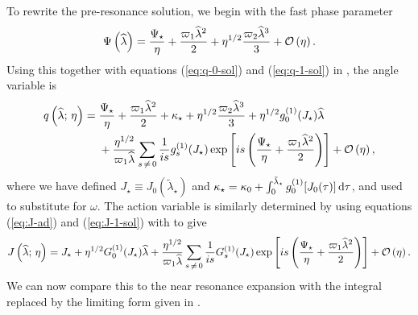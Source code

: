To rewrite the pre-resonance solution, we begin with the fast phase parameter
\begin{equation}
\Psi\left(\widehat{\lambda}\right) = \dfrac{\Psi_\star}{\eta} + \dfrac{\varpi_1\widehat{\lambda}^2}{2} + \eta^{1/2}\dfrac{\varpi_2\widehat{\lambda}^3}{3} + \mathcal{O}\left({\eta}\right).
\end{equation}
Using this together with equations (\ref{eq:q-0-sol}) and (\ref{eq:q-1-sol}) in , the angle variable is
\begin{align}
q\left(\widehat{\lambda};\,\eta\right) = {} & \dfrac{\Psi_\star}{\eta} + \dfrac{\varpi_1\widehat{\lambda}^2}{2} + \kappa_\star + \eta^{1/2}\dfrac{\varpi_2\widehat{\lambda}^3}{3} + \eta^{1/2}g_0^{(1)}(J_\star)\widehat{\lambda} \nonumber \\* 
 {} & + \dfrac{\eta^{1/2}}{\varpi_1\widehat{\lambda}}\sum_{s\,\neq\,0}\dfrac{1}{is}g_s^{(1)}(J_\star)\exp\left[is\left(\dfrac{\Psi_\star}{\eta} + \dfrac{\varpi_1\widehat{\lambda}^2}{2}\right)\right] + \mathcal{O}\left({\eta}\right),
\end{align}
where we have defined $J_\star \equiv J_0\left(\widetilde{\lambda}_\star\right)$ and $\kappa_\star = \kappa_0 + \int_{0}^{\tilde{\lambda}_\star}{g_0^{(1)}[J_0(\tau)]}\,\mathrm{d}{\tau}$, and used  to substitute for $\omega$. The action variable is similarly determined by using equations (\ref{eq:J-ad}) and (\ref{eq:J-1-sol}) with  to give
\begin{equation}
J\left(\widehat{\lambda};\,\eta\right) = J_\star + \eta^{1/2}G_0^{(1)}(J_\star)\widehat{\lambda} + \dfrac{\eta^{1/2}}{\varpi_1\widehat{\lambda}}\sum_{s\,\neq\,0}\dfrac{1}{is}G_s^{(1)}(J_\star)\exp\left[is\left(\dfrac{\Psi_\star}{\eta} + \dfrac{\varpi_1\widehat{\lambda}^2}{2}\right)\right] + \mathcal{O}\left({\eta}\right).
\end{equation}
We can now compare this to the near resonance expansion with the integral replaced by the limiting form given in .


